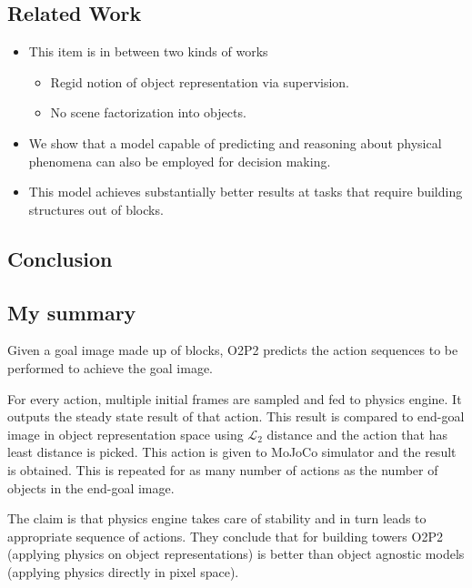 \documentclass{article}
\begin{document}
    \subsection{Related Work}\label{subsec:Reasoning_about_Physical_Interactions_with_Object_Oriented_Prediction_and_Planning_(O2P2):related-work}
    \begin{itemize}
        \item This item is in between two kinds of works
        \begin{itemize}
            \item Regid notion of object representation via supervision.
            \item No scene factorization into objects.
        \end{itemize}
        \item We show that a model capable of predicting and reasoning about physical phenomena can also be employed for decision making.
        \item This model achieves substantially better results at tasks that require building structures out of blocks.
    \end{itemize}

    \subsection{Conclusion}\label{subsec:Reasoning_about_Physical_Interactions_with_Object_Oriented_Prediction_and_Planning_(O2P2):conclusion}

    \subsection{My summary}\label{subsec:Reasoning_about_Physical_Interactions_with_Object_Oriented_Prediction_and_Planning_(O2P2):my-summary}
    Given a goal image made up of blocks, O2P2 predicts the action sequences to be performed to achieve the goal image.

    For every action, multiple initial frames are sampled and fed to physics engine.
    It outputs the steady state result of that action.
    This result is compared to end-goal image in object representation space using $\mathcal{L}_2$ distance and the action that has least distance is picked.
    This action is given to MoJoCo simulator and the result is obtained.
    This is repeated for as many number of actions as the number of objects in the end-goal image.

    The claim is that physics engine takes care of stability and in turn leads to appropriate sequence of actions.
    They conclude that for building towers O2P2 (applying physics on object representations) is better than object agnostic models (applying physics directly in pixel space).
    \newpage
\end{document}
